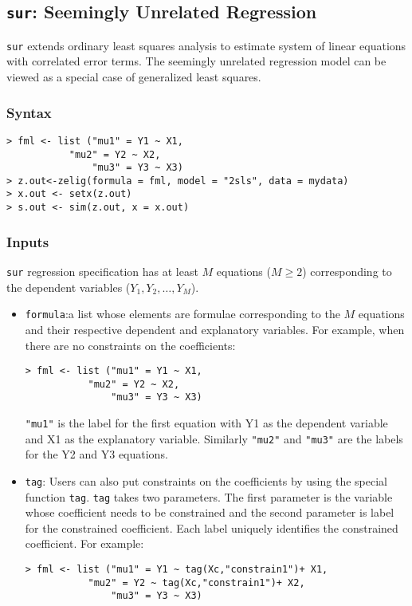 \subsection{\texttt{sur}: Seemingly Unrelated Regression}
\label{sur}
\texttt{sur} extends ordinary least squares analysis to estimate system of linear 
equations with correlated error terms. The seemingly unrelated regression model can
be viewed as a special case of generalized least squares.
\subsubsection{Syntax}
\begin{verbatim}
> fml <- list ("mu1" = Y1 ~ X1,
	       "mu2" = Y2 ~ X2,
               "mu3" = Y3 ~ X3)
> z.out<-zelig(formula = fml, model = "2sls", data = mydata)
> x.out <- setx(z.out)
> s.out <- sim(z.out, x = x.out)
\end{verbatim}
\subsubsection{Inputs}
\texttt{sur} regression specification has at least $M$ equations 
($M \ge 2$) corresponding to the dependent variables ($Y_1, Y_2, \ldots, Y_M$).
\begin{itemize}
\item \texttt{formula}:a list whose elements are formulae corresponding to 
the $M$ equations and their respective dependent and explanatory variables.
For example, when there are no constraints on the coefficients:
\begin{verbatim}
> fml <- list ("mu1" = Y1 ~ X1,
	       "mu2" = Y2 ~ X2,
               "mu3" = Y3 ~ X3)
\end{verbatim}
\texttt{"mu1"} is the label for the first equation with Y1 as the dependent variable
and X1 as the explanatory variable. Similarly \texttt{"mu2"} and \texttt{"mu3"} are the
labels for the Y2 and Y3 equations.
\item \texttt{tag}: Users can also put constraints on the coefficients by using
the special function \texttt{tag}. \texttt{tag} takes two parameters. The first
parameter is the variable whose coefficient needs to be constrained and the second
parameter is label for the constrained coefficient. Each label uniquely identifies
the constrained coefficient. For example:
\begin{verbatim}
> fml <- list ("mu1" = Y1 ~ tag(Xc,"constrain1")+ X1,
	       "mu2" = Y2 ~ tag(Xc,"constrain1")+ X2,
               "mu3" = Y3 ~ X3)
\end{verbatim}
\end{itemize}
